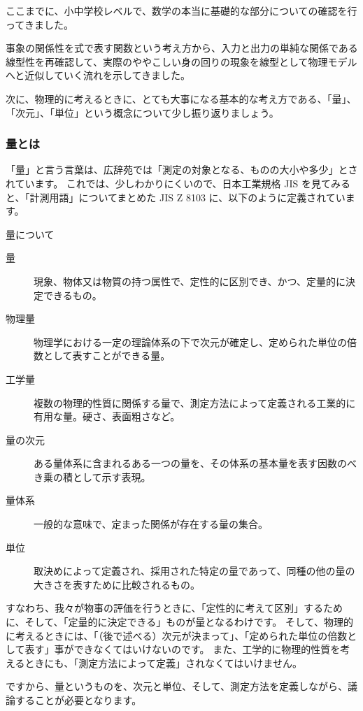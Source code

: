 \documentclass[uplatex,dvipdfmx,a4paper,11pt]{jsreport}
\begin{document}
ここまでに、小中学校レベルで、数学の本当に基礎的な部分についての確認を行ってきました。

事象の関係性を式で表す関数という考え方から、入力と出力の単純な関係である線型性を再確認して、実際のややこしい身の回りの現象を線型として物理モデルへと近似していく流れを示してきました。

次に、物理的に考えるときに、とても大事になる基本的な考え方である、「量」、「次元」、「単位」という概念について少し振り返りましょう。


\subsubsection{量とは}
「量」と言う言葉は、広辞苑では「測定の対象となる、ものの大小や多少」とされています。
これでは、少しわかりにくいので、日本工業規格 JIS を見てみると、「計測用語」についてまとめた JIS Z 8103 に、以下のように定義されています。
\large
\begin{itembox}[l]{量について}
	\begin{description}
		\item[量] 現象、物体又は物質の持つ属性で、定性的に区別でき、かつ、定量的に決定できるもの。
		\item[物理量] 物理学における一定の理論体系の下で次元が確定し、定められた単位の倍数として表すことができる量。
		\item[工学量] 複数の物理的性質に関係する量で、測定方法によって定義される工業的に有用な量。硬さ、表面粗さなど。
		\item[量の次元] ある量体系に含まれるある一つの量を、その体系の基本量を表す因数のべき乗の積として示す表現。
		\item[量体系] 一般的な意味で、定まった関係が存在する量の集合。
		\item[単位] 取決めによって定義され、採用された特定の量であって、同種の他の量の大きさを表すために比較されるもの。
	\end{description}
\end{itembox}
\normalsize

すなわち、我々が物事の評価を行うときに、「定性的に考えて区別」するために、そして、「定量的に決定できる」ものが量となるわけです。
そして、物理的に考えるときには、「（後で述べる）次元が決まって」、「定められた単位の倍数として表す」事ができなくてはいけないのです。
また、工学的に物理的性質を考えるときにも、「測定方法によって定義」されなくてはいけません。

ですから、量というものを、次元と単位、そして、測定方法を定義しながら、議論することが必要となります。
\end{document}
